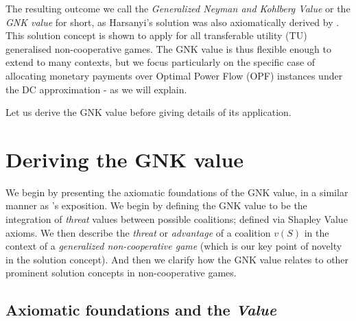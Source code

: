 The resulting outcome we call the \textit{Generalized Neyman and Kohlberg Value} or the \textit{GNK value} for short, 
as Harsanyi's solution was also axiomatically derived by \cite{value2,KOHLBERG2018139}.
This solution concept is shown to apply for all transferable utility (TU) generalised non-cooperative games.
The GNK value is thus flexible enough to extend to many contexts, but we focus particularly on the specific case of allocating monetary payments over Optimal Power Flow (OPF) instances under the DC approximation - as we will explain.

Let us derive the GNK value before giving details of its application.

\section{Deriving the GNK value}\label{the_value_def2}

We begin by presenting the axiomatic foundations of the GNK value, in a similar manner as \cite{value2}'s exposition.
We begin by defining the GNK value to be the integration of \emph{threat} values between possible coalitions; defined via Shapley Value axioms.
We then describe the \emph{threat} or \emph{advantage} of a coalition $v(S)$ in the context of a \textit{generalized non-cooperative game} (which is our key point of novelty in the solution concept).
And then we clarify how the GNK value relates to other prominent solution concepts in non-cooperative games.

\subsection{Axiomatic foundations and the \textit{Value}}\label{the_value_def}


